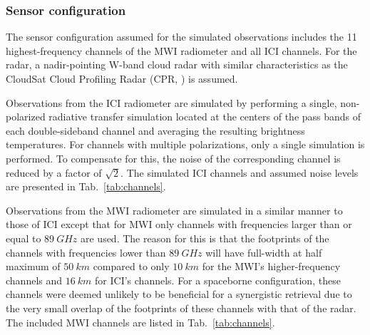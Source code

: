 \documentclass[journal abbreviation, manuscript]{copernicus}
\begin{document}
\subsubsection{Sensor configuration}
\label{sec:sensors}
The sensor configuration assumed for the simulated observations includes the 11
highest-frequency channels of the MWI radiometer and all ICI channels. For the
radar, a nadir-pointing W-band cloud radar with similar characteristics as the
CloudSat Cloud Profiling Radar (CPR, \citet{stephens02,tanelli08}) is assumed.

Observations from the ICI radiometer are simulated by performing a single,
non-polarized radiative transfer simulation located at the centers of the pass
bands of each double-sideband channel and averaging the resulting brightness
temperatures. For channels with multiple polarizations, only a single simulation
is performed. To compensate for this, the noise of the corresponding channel is
reduced by a factor of $\sqrt{2}$. The simulated ICI channels and assumed noise
levels are presented in Tab.~\ref{tab:channels}.

Observations from the MWI radiometer are simulated in a similar manner to those
of ICI except that for MWI only channels with frequencies larger than or equal
to $89\ \unit{GHz}$ are used. The reason for this is that the footprints of the
channels with frequencies lower than $89\ \unit{GHz}$ will have full-width at
half maximum of $50\ \unit{km}$ compared to only $10\ \unit{km}$ for the MWI's
higher-frequency channels and $16\ \unit{km}$ for ICI's channels. For a
spaceborne configuration, these channels were deemed unlikely to be beneficial
for a synergistic retrieval due to the very small  overlap of the
footprints of these channels with that of the radar. The included MWI channels
are listed in Tab.~\ref{tab:channels}.
\end{document}

